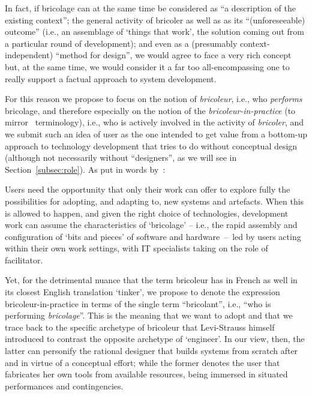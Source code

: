 \documentclass{article}
\let\origquotation\quotation
\let\endorigquotation\endquotation
\renewenvironment{quotation}{\vspace{-0.5\parskip}
  \origquotation
  \footnotesize
}{\endorigquotation}
\begin{document}
In fact, if bricolage can at the same time be considered as ``a description of the existing context''; the general activity of bricoler as well as as its ``(unforeseeable) outcome'' (i.e., an assemblage of `things that work', the solution coming out from a particular round of development); and even as a (presumably context-independent) ``method for design'', we would agree to face a very rich concept but, at the same time, we would consider it a far too all-encompassing one to really support a factual approach to system development.


For this reason we propose to focus on the notion of \emph{bricoleur}, i.e., who \emph{performs} bricolage, and therefore especially on the notion of the \emph{bricoleur-in-practice} (to mirror~\citet[][]{orlikowski_using_2000} terminology), i.e., who is actively involved in the activity of \emph{bricoler}, and we submit such an idea of user as the one intended to get value from a bottom-up approach to technology development that tries to do without conceptual design (although not necessarily without ``designers'', as we will see in Section~\ref{subsec:role}). As put in words by~\citet{hartswood_being_2000}:

\begin{quotation}
Users need the opportunity that only their work can offer to explore fully the possibilities for
adopting, and adapting to, new systems and artefacts. When this is allowed to happen, and given the right choice
of technologies, development work can assume the characteristics of `bricolage' -- i.e., the rapid assembly and
configuration of `bits and pieces' of software and hardware~--~led by users acting within their own work settings,
with IT specialists taking on the role of facilitator.
\end{quotation}

Yet, for the detrimental nuance that the term bricoleur has in French as well in its closest English translation `tinker', we propose to denote the expression bricoleur-in-practice in terms of the single term ``bricolant'', i.e., ``who is performing \emph{bricolage}''. This is the meaning that we want to adopt and that we trace back to the specific archetype of bricoleur that Levi-Strauss himself introduced to contrast the opposite archetype of `engineer'. In our view, then, the latter can personify the rational designer that builds systems from scratch after and in virtue of a conceptual effort; while the former denotes the user that fabricates her own tools from available resources, being immersed in situated performances and contingencies.
\end{document}
